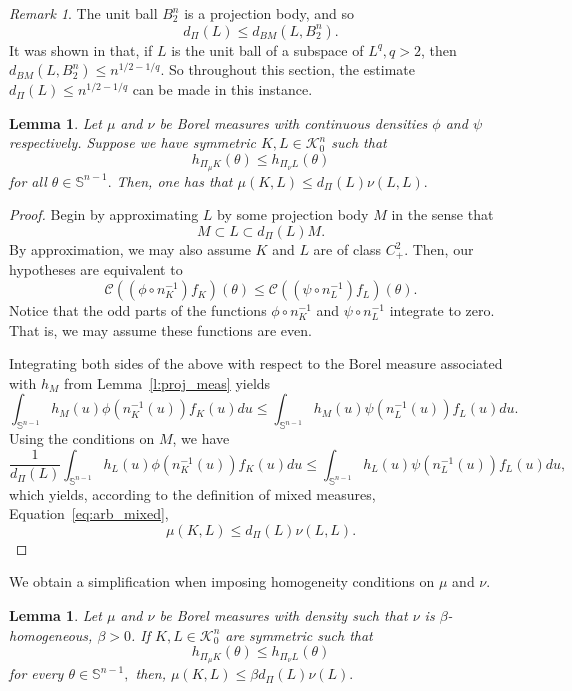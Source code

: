 \documentclass[11pt]{amsart}
\newtheorem{lemma}[theorem]{Lemma}
\theoremstyle{definition}
\theoremstyle{remark}
\newtheorem{remark}[theorem]{Remark}
\numberwithin{equation}{section}
\newcommand{\s}{\mathbb{S}}
\newcommand{\conbod}{\mathcal{K}^n}
\newcommand{\ct}[2]{\mathcal{C}({#1})({#2})}
\begin{document}
\begin{remark}
The unit ball $B_2^n$ is a projection body, and so $$d_\Pi(L)\leq d_{BM}(L,B_2^n).$$ It was shown in \cite{DL78,SZ01} that, if $L$ is the unit ball of a subspace of $L^q, q>2$, then $d_{BM}(L,B_2^n)\leq n^{1/2-1/q}$. So throughout this section, the estimate $d_\Pi(L)\leq n^{1/2-1/q}$ can be made in this instance.
\end{remark}
\begin{lemma}
\label{l:q_0}
Let $\mu$ and $\nu$ be Borel measures with continuous densities $\phi$ and $\psi$ respectively. Suppose we have symmetric $K,L\in\conbod_0$ such that
$$h_{\Pi_\mu K}(\theta)\leq h_{\Pi_\nu L}(\theta)$$ for all $\theta\in\s^{n-1}.$ Then, one has that
$\mu(K,L)\leq d_{\Pi}(L)\nu(L,L).$
\end{lemma}
\begin{proof}
Begin by approximating $L$ by some projection body $M$ in the sense that $$M\subset L \subset d_{\Pi}(L) M.$$ By approximation, we may also assume $K$ and $L$ are of class $C^2_+$. Then, our hypotheses are equivalent to
 $$\ct{\left(\phi\circ n_K^{-1}\right)f_K}{\theta} \leq \ct{\left(\psi\circ n_L^{-1}\right)f_L}{\theta}.$$ 
  Notice that the odd parts of the functions $\phi\circ n_K^{-1}$ and $\psi\circ n_L^{-1}$ integrate to zero. That is, we may assume these functions are even.
 
 Integrating both sides of the above with respect to the Borel measure associated with $h_M$ from Lemma~\ref{l:proj_meas} yields
$$\int_{\s^{n-1}}h_M(u)\phi\left(n_{K}^{-1}(u)\right) f_{K}(u) du \leq \int_{\s^{n-1}} h_M(u) \psi\left(n_L^{-1}(u)\right)f_L (u)du.$$
Using the conditions on $M$, we have
\begin{equation}\frac{1}{d_{\Pi}(L)}\int_{\s^{n-1}}h_L(u)\phi\left(n_{K}^{-1}(u)\right) f_{K}(u) du \leq \int_{\s^{n-1}} h_L(u) \psi\left( n_L^{-1}(u)\right)f_L (u)du,
\label{eq:shep}
\end{equation}
which yields, according to the definition of mixed measures, Equation~\ref{eq:arb_mixed},
$$
  \mu(K,L) \leq d_{\Pi}(L)\nu(L,L).
$$
\end{proof}
We obtain a simplification when imposing homogeneity conditions on $\mu$ and $\nu$.
\begin{lemma}
\label{l:q_1}
Let $\mu$ and $\nu$ be Borel measures with density such that $\nu$ is $\beta$-homogeneous, $\beta>0$. If $K,L\in\conbod_0$ are symmetric such that $$h_{\Pi_{\mu} K}(\theta) \le h_{\Pi_{\nu} L}(\theta)$$ for every $\theta\in\s^{n-1},$ then,
$\mu(K,L) \leq \beta d_{\Pi}(L)\nu(L).$
\end{lemma}
\end{document}
